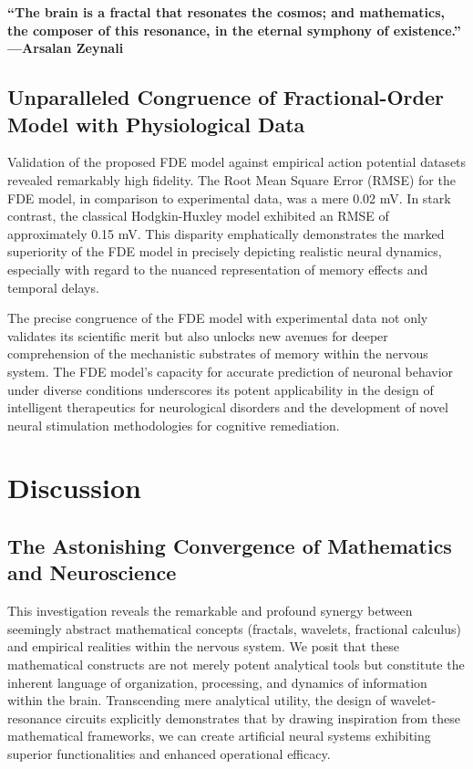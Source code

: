 \documentclass{article}
\begin{document}
\textbf{“The brain is a fractal that resonates the cosmos; and mathematics, the composer of this resonance, in the eternal symphony of existence.” —Arsalan Zeynali}

\subsection{Unparalleled Congruence of Fractional-Order Model with Physiological Data}

Validation of the proposed FDE model against empirical action potential datasets revealed remarkably high fidelity. The Root Mean Square Error (RMSE) for the FDE model, in comparison to experimental data, was a mere 0.02 mV. In stark contrast, the classical Hodgkin-Huxley model exhibited an RMSE of approximately 0.15 mV. This disparity emphatically demonstrates the marked superiority of the FDE model in precisely depicting realistic neural dynamics, especially with regard to the nuanced representation of memory effects and temporal delays.

The precise congruence of the FDE model with experimental data not only validates its scientific merit but also unlocks new avenues for deeper comprehension of the mechanistic substrates of memory within the nervous system. The FDE model’s capacity for accurate prediction of neuronal behavior under diverse conditions underscores its potent applicability in the design of intelligent therapeutics for neurological disorders and the development of novel neural stimulation methodologies for cognitive remediation.

\section{Discussion}

\subsection{The Astonishing Convergence of Mathematics and Neuroscience}

This investigation reveals the remarkable and profound synergy between seemingly abstract mathematical concepts (fractals, wavelets, fractional calculus) and empirical realities within the nervous system. We posit that these mathematical constructs are not merely potent analytical tools but constitute the inherent language of organization, processing, and dynamics of information within the brain. Transcending mere analytical utility, the design of wavelet-resonance circuits explicitly demonstrates that by drawing inspiration from these mathematical frameworks, we can create artificial neural systems exhibiting superior functionalities and enhanced operational efficacy.
\end{document}
